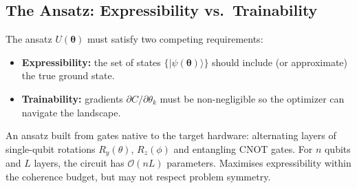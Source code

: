 \documentclass[a4paper,11pt]{article}
\renewcommand{\ket}[1]{|#1\rangle}
\begin{document}
\begin{center}
\end{center}

\subsection{The Ansatz: Expressibility vs.\ Trainability}

The ansatz $U(\boldsymbol\theta)$ must satisfy two competing requirements:
\begin{itemize}
    \item \textbf{Expressibility:} the set of states
          $\{\ket{\psi(\boldsymbol\theta)}\}$ should include (or approximate)
          the true ground state.
    \item \textbf{Trainability:} gradients $\partial C/\partial\theta_k$
          must be non-negligible so the optimizer can navigate the landscape.
\end{itemize}

\begin{defbox}
An ansatz built from gates native to the target hardware:
alternating layers of single-qubit rotations $R_y(\theta)$, $R_z(\phi)$
and entangling CNOT gates. For $n$ qubits and $L$ layers, the circuit has
$\mathcal{O}(nL)$ parameters. Maximises expressibility within the coherence
budget, but may not respect problem symmetry.
\end{defbox}
\end{document}

